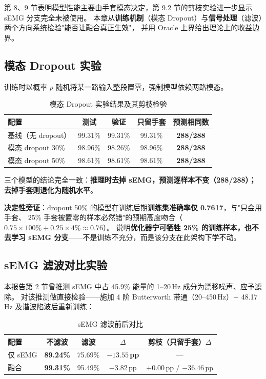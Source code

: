 \documentclass[11pt,a4paper]{ctexart}
\begin{document}
第 8、9 节表明模型性能主要由手套模态决定，第 9.2 节的剪枝实验进一步显示 sEMG 分支完全未被使用。
本章从\textbf{训练机制}（模态 Dropout）与\textbf{信号处理}（滤波）两个方向系统检验"能否让融合真正生效"，
并用 Oracle 上界给出理论上的收益边界。

\subsection{模态 Dropout 实验}

训练时以概率 $p$ 随机将某一路输入整段置零，强制模型依赖两路模态。

\begin{table}[htbp]\centering
\caption{模态 Dropout 实验结果及其剪枝检验}
\label{tab:moddrop}
\small
\setlength{\tabcolsep}{4.5pt}
\begin{tabular}{lcccc}
\toprule
配置 & 测试 & 验证 & 只留手套 & 预测相同数 \\
\midrule
基线（无 dropout） & 99.31\% & 99.31\% & 99.31\% & \textbf{288/288} \\
模态 dropout 30\% & 98.96\% & 98.26\% & 98.96\% & \textbf{288/288} \\
模态 dropout 50\% & 98.61\% & 98.61\% & 98.61\% & \textbf{288/288} \\
\bottomrule
\end{tabular}
\end{table}

三个模型的结论完全一致：\textbf{推理时去掉 sEMG，预测逐样本不变（288/288）；去掉手套则退化为随机水平}。

\textbf{决定性旁证}：dropout 50\% 的模型在训练后期\textbf{训练集准确率仅 0.7617}，与"只会用手套、
25\% 手套被置零的样本必然错"的预期高度吻合（$0.75\times100\% + 0.25\times4\% \approx 0.76$）。
说明\textbf{优化器宁可牺牲 25\% 的训练样本，也不去学习 sEMG 分支}——不是训练不充分，而是该分支在此架构下学不动。

\subsection{sEMG 滤波对比实验}

本报告第 2 节曾推测 sEMG 中占 45.9\% 能量的 1--20\,Hz 成分为漂移噪声、应予滤除。
对该推测做直接检验——施加 4 阶 Butterworth 带通（20--450\,Hz）+ 48.17\,Hz 及谐波陷波后重新训练：

\begin{table}[htbp]\centering
\caption{sEMG 滤波前后对比}
\label{tab:filter}
\begin{tabular}{lcccc}
\toprule
配置 & 不滤波 & 滤波 & $\Delta$ & 剪枝（只留手套）$\Delta$ \\
\midrule
仅 sEMG & \textbf{89.24\%} & 75.69\% & \textbf{$-13.55$\,pp} & --- \\
融合 & \textbf{99.31\%} & 95.49\% & $-3.82$\,pp & $+0.00$\,pp / $\mathbf{-36.46}$\,pp \\
\bottomrule
\end{tabular}
\end{table}
\end{document}
